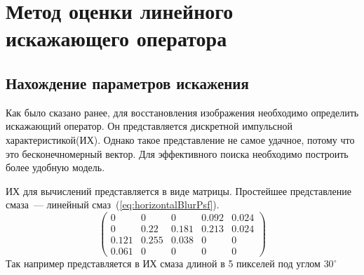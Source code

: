 \chapter{Метод оценки линейного искажающего оператора}
\section{Нахождение параметров искажения}
Как было сказано ранее, для восстановления изображения необходимо определить искажающий оператор. Он представляется дискретной импульсной характеристикой(ИХ). Однако такое представление не самое удачное, потому что это бесконечномерный вектор. Для эффективного поиска необходимо построить более удобную модель.

ИХ для вычислений представляется в виде матрицы. Простейшее представление смаза~--- линейный смаз~(\ref{eq:horizontalBlurPsf}).
\begin{equation}\label{eq:linearBlurArray}
\begin{pmatrix}
0 & 0 & 0 & 0.092 & 0.024\\
0 & 0.22 & 0.181 & 0.213 & 0.024\\
0.121 & 0.255 & 0.038 & 0 & 0\\
0.061 & 0 & 0 & 0 & 0
\end{pmatrix}
\end{equation}
Так например представляется в ИХ смаза длиной в 5 пикселей под углом $30^\circ$
